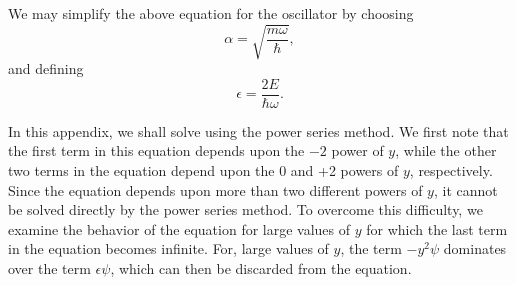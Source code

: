 \begin{backchapter}
We may simplify the above equation for the oscillator by choosing
\[
\alpha=\sqrt{\frac{m\omega}{\hbar}},
\]
and defining
\begin{equation}\label{app1:eq5}
\epsilon=\frac{2E}{\hbar\omega}.
\end{equation}


In this appendix, we shall solve  using the power series method. We first
note that the first term in this equation depends upon the $-2$ power of $y$, while
the other two terms in the equation depend upon the 0 and +2 powers of $y$,
respectively. Since the equation depends upon more than two different powers of $y$, it
cannot be solved directly by the power series method. To overcome this difficulty, we
examine the behavior of the equation for large values of $y$ for which the last term in
the equation becomes infinite. For, large values of $y$, the term $-y^2\psi$ dominates
over the term $\epsilon\psi$, which can then be discarded from the equation.
\end{backchapter}
